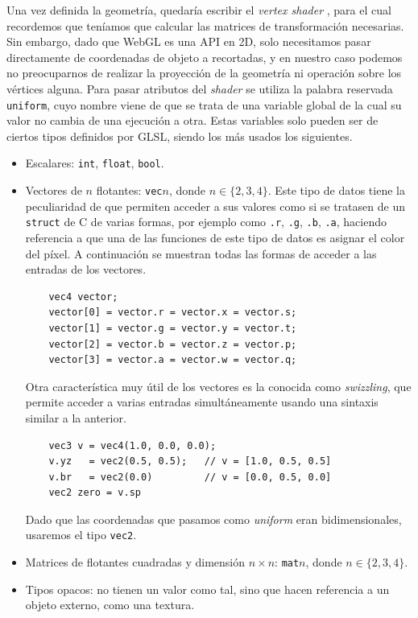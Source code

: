 Una vez definida la geometría, quedaría escribir el \textit{vertex shader} \cite{webgl_ejemplo}, para el cual recordemos que teníamos que calcular las matrices de transformación necesarias. Sin embargo, dado que WebGL es una API en 2D, solo necesitamos pasar directamente de coordenadas de objeto a recortadas, y en nuestro caso podemos no preocuparnos de realizar la proyección de la geometría ni operación sobre los vértices alguna. Para pasar atributos del \textit{shader} se utiliza la palabra reservada \texttt{uniform}, cuyo nombre viene de que se trata de una variable global de la cual su valor no cambia de una ejecución a otra. Estas variables solo pueden ser de ciertos tipos definidos por GLSL, siendo los más usados los siguientes.
\begin{itemize}
    \item Escalares: \texttt{int}, \texttt{float}, \texttt{bool}.
    \item Vectores de $n$ flotantes: \texttt{vec$n$}, donde $n\in \{2,3,4\}$. Este tipo de datos tiene la peculiaridad de que permiten acceder a sus valores como si se tratasen de un \texttt{struct} de C de varias formas, por ejemplo como \texttt{.r}, \texttt{.g}, \texttt{.b}, \texttt{.a}, haciendo referencia a que una de las funciones de este tipo de datos es asignar el color del píxel. A continuación se muestran todas las formas de acceder a las entradas de los vectores.
    \begin{lstlisting}
    vec4 vector;
    vector[0] = vector.r = vector.x = vector.s;
    vector[1] = vector.g = vector.y = vector.t;
    vector[2] = vector.b = vector.z = vector.p;
    vector[3] = vector.a = vector.w = vector.q;
    \end{lstlisting}
    Otra característica muy útil de los vectores es la conocida como \textit{swizzling}, que permite acceder a varias entradas simultáneamente usando una sintaxis similar a la anterior.
    \begin{lstlisting}
    vec3 v = vec4(1.0, 0.0, 0.0);
    v.yz   = vec2(0.5, 0.5);   // v = [1.0, 0.5, 0.5]
    v.br   = vec2(0.0)         // v = [0.0, 0.5, 0.0]
    vec2 zero = v.sp 
    \end{lstlisting}
    Dado que las coordenadas que pasamos como \textit{uniform} eran bidimensionales, usaremos el tipo \texttt{vec2}.
    \item Matrices de flotantes cuadradas y dimensión $n\times n$: \texttt{mat$n$},  donde $n\in \{2,3,4\}$.
    \item Tipos opacos: no tienen un valor como tal, sino que hacen referencia a un objeto externo, como una textura.
\end{itemize}
 
